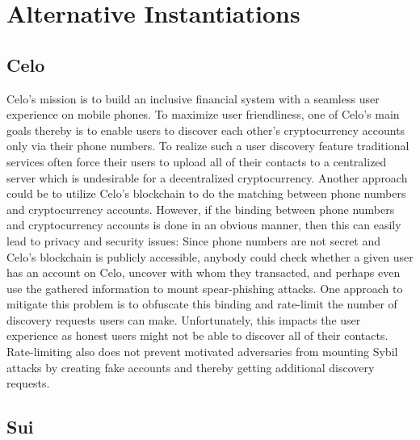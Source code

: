\section{Alternative Instantiations} \label{sec:instantiations}

\subsection{Celo}

Celo's mission is to build an inclusive financial system with a seamless user
experience on mobile phones. To maximize user friendliness, one of Celo's main
goals thereby is to enable users to discover each other's cryptocurrency accounts
only via their phone numbers. To realize such a user discovery feature
traditional services often force their users to upload all of their contacts to
a centralized server which is undesirable for a decentralized
cryptocurrency. Another approach could be to utilize Celo's blockchain to do the
matching between phone numbers and cryptocurrency accounts. However, if the
binding between phone numbers and cryptocurrency accounts is done in an obvious
manner, then this can easily lead to privacy and security issues: Since phone
numbers are not secret and Celo's blockchain is publicly accessible, anybody
could check whether a given user has an account on Celo, uncover with whom they
transacted, and perhaps even use the gathered information to mount
spear-phishing attacks.  One approach to mitigate this problem is to obfuscate
this binding and rate-limit the number of discovery requests users can make.
Unfortunately, this impacts the user experience as honest users might not be
able to discover all of their contacts. Rate-limiting also does not prevent
motivated adversaries from mounting Sybil attacks by creating fake accounts and
thereby getting additional discovery requests.


\subsection{Sui}
